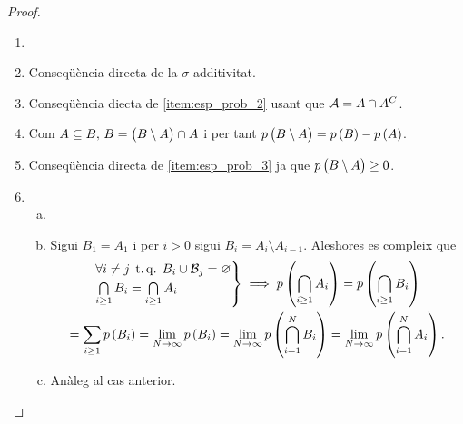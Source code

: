 \begin{proof}
    \begin{enumerate}
     \item[]
     \item Conseqüència directa de la $\sigma$-additivitat.
     \item Conseqüència diecta de \ref{item:esp_prob_2} usant que $\mathcal{A} = A\cap A^C$.
     \item Com $A\subseteq B,\, B=\left( B\setminus A\right) \cap A$ i per tant $p\left( B\setminus A \right) = p\left( B\right) - p\left( A\right)$.
     \item Conseqüència directa de \ref{item:esp_prob_3} ja que $p\left( B\setminus A\right)\geq 0$.
     \item 
     \begin{enumerate}[a)]
       \item[]
       \item Sigui $B_1=A_1$ i per $i>0$ sigui $B_i = A_i\setminus A_{i-1}$. Aleshores es compleix que
       \begin{gather*}
        \begin{rcases}
	  \forall i\neq j \operatorname{\;t.q.\;} B_i \cup \mathcal{B}_j =\varnothing \\
	  \bigcap\limits_{i\geq 1} B_i = \bigcap\limits_{i\geq 1} A_i
        \end{rcases}
        \implies p\left(\bigcap\limits_{i\geq 1} A_i\right) = p\left(\bigcap\limits_{i\geq 1} B_i\right) \\
        = \sum\limits_{i\geq 1} p\left( B_i\right) = \lim\limits_{N\to\infty} p\left( B_i\right) = \lim\limits_{N\to\infty} p\left(\bigcap\limits_{i=1}^N B_i\right) = 
        \lim\limits_{N\to\infty} p\left(\bigcap\limits_{i=1}^N A_i\right).
       \end{gather*}
      \item Anàleg al cas anterior.
     \end{enumerate}
    \end{enumerate}
\end{proof}
